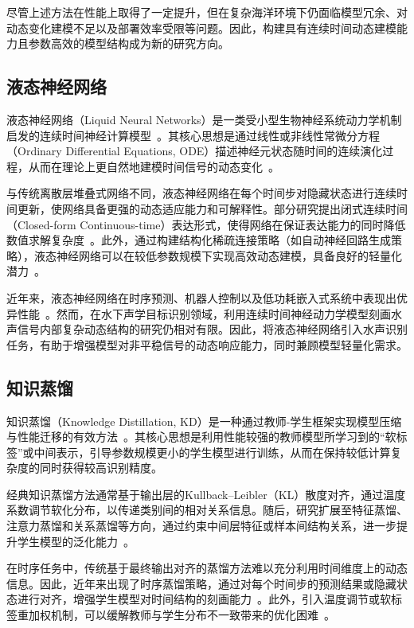 \documentclass[a4paper, 12pt]{article}
\begin{document}
尽管上述方法在性能上取得了一定提升，但在复杂海洋环境下仍面临模型冗余、对动态变化建模不足以及部署效率受限等问题。因此，构建具有连续时间动态建模能力且参数高效的模型结构成为新的研究方向。

\subsection{液态神经网络}

液态神经网络（Liquid Neural Networks）是一类受小型生物神经系统动力学机制启发的连续时间神经计算模型~\cite{Hasani2021LTC}。其核心思想是通过线性或非线性常微分方程（Ordinary Differential Equations, ODE）描述神经元状态随时间的连续演化过程，从而在理论上更自然地建模时间信号的动态变化~\cite{Chen2018NeuralODE}。

与传统离散层堆叠式网络不同，液态神经网络在每个时间步对隐藏状态进行连续时间更新，使网络具备更强的动态适应能力和可解释性。部分研究提出闭式连续时间（Closed-form Continuous-time）表达形式，使得网络在保证表达能力的同时降低数值求解复杂度~\cite{Hasani2022CfC}。此外，通过构建结构化稀疏连接策略（如自动神经回路生成策略），液态神经网络可以在较低参数规模下实现高效动态建模，具备良好的轻量化潜力~\cite{Lechner2020NCP}。

近年来，液态神经网络在时序预测、机器人控制以及低功耗嵌入式系统中表现出优异性能~\cite{Lechner2020NCP,Hasani2021LTC,Hasani2022CfC}。然而，在水下声学目标识别领域，利用连续时间神经动力学模型刻画水声信号内部复杂动态结构的研究仍相对有限。因此，将液态神经网络引入水声识别任务，有助于增强模型对非平稳信号的动态响应能力，同时兼顾模型轻量化需求。

\subsection{知识蒸馏}

知识蒸馏（Knowledge Distillation, KD）是一种通过教师-学生框架实现模型压缩与性能迁移的有效方法~\cite{Bucila2006Compression,Hinton2015Distilling,Gou2021KDSurvey}。其核心思想是利用性能较强的教师模型所学习到的“软标签”或中间表示，引导参数规模更小的学生模型进行训练，从而在保持较低计算复杂度的同时获得较高识别精度。

经典知识蒸馏方法通常基于输出层的Kullback–Leibler（KL）散度对齐，通过温度系数调节软化分布，以传递类别间的相对关系信息。随后，研究扩展至特征蒸馏、注意力蒸馏和关系蒸馏等方向，通过约束中间层特征或样本间结构关系，进一步提升学生模型的泛化能力~\cite{Romero2015FitNets,Zagoruyko2017AT,Park2019RKD}。

在时序任务中，传统基于最终输出对齐的蒸馏方法难以充分利用时间维度上的动态信息。因此，近年来出现了时序蒸馏策略，通过对每个时间步的预测结果或隐藏状态进行对齐，增强学生模型对时间结构的刻画能力~\cite{Farhadi2019TKD,Wang2023TSKD}。此外，引入温度调节或软标签重加权机制，可以缓解教师与学生分布不一致带来的优化困难~\cite{Sun2024LSKD,Zhou2021WSLD}。
\end{document}

